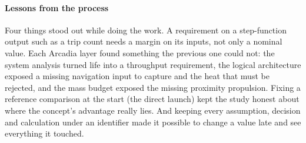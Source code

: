 \documentclass[11pt,a4paper]{article}
\begin{document}
\paragraph{Lessons from the process} Four things stood out while doing the work. A requirement on a step-function output such as a trip count needs a margin on its inputs, not only a nominal value. Each Arcadia layer found something the previous one could not: the system analysis turned life into a throughput requirement, the logical architecture exposed a missing navigation input to capture and the heat that must be rejected, and the mass budget exposed the missing proximity propulsion. Fixing a reference comparison at the start (the direct launch) kept the study honest about where the concept's advantage really lies. And keeping every assumption, decision and calculation under an identifier made it possible to change a value late and see everything it touched.
\end{document}
